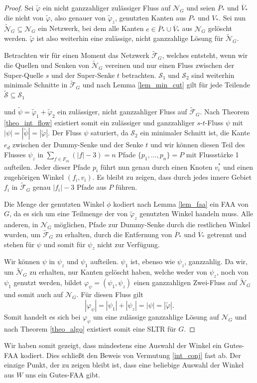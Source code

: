 \begin{proof}
Sei $\tilde{\varphi}$ ein nicht ganzzahliger zulässiger Fluss auf $\mathcal{N}_G$ und seien $\overline{P}_*$ und $\overline{V}_*$ die nicht von $\tilde{\varphi}$, also genauer von $\tilde{\varphi}_z$, genutzten Kanten aus $P_*$ und $V_*$. Sei nun $\tilde{\mathcal{N}}_G \subseteq \mathcal{N}_G$ ein Netzwerk, bei dem alle Kanten $e \in \overline{P}_*\cup\overline{V}_*$ aus $\mathcal{N}_G$ gelöscht werden. $\tilde{\varphi}$ ist also weiterhin eine zulässige, nicht ganzzahlige Lösung für $\tilde{\mathcal{N}}_G$.

Betrachten wir für einen Moment das Netzwerk $\tilde{\mathcal{F}}_G$, welches entsteht, wenn wir die Quellen und Senken von $\tilde{\mathcal{N}}_G$ vereinen und nur einen Fluss zwischen der Super-Quelle $s$ und der Super-Senke $t$ betrachten. $\mathcal{S}_1$ und $\mathcal{S}_2$ sind weiterhin minimale Schnitte in $\tilde{\mathcal{F}}_G$ und nach Lemma \ref{lem_min_cut} gilt für jede Teilende $\tilde{\mathcal{S}} \subseteq \mathcal{S}_1$


und $\tilde{\psi} = \tilde{\varphi}_1+ \tilde{\varphi}_2$ ein zulässiger, nicht ganzzahliger Fluss auf $\tilde{\mathcal{F}}_G$. Nach Theorem \ref{theo_int_flow} existiert somit ein zulässiger und ganzzahliger $s$-$t$-Fluss $\psi$ mit $|\psi| = |\tilde{\psi}| = |\tilde{\varphi}|.$ Der Fluss $\psi$ saturiert, da $\mathcal{S}_2$ ein minimaler Schnitt ist, die Kante $e_d$ zwischen der Dummy-Senke und der Senke $t$ und wir können diesen Teil des Flusses $\psi_z$ in $\sum_{f \in F_{in}}(|f|-3)=n$ Pfade $\{p_1, ... ,p_n\} = P$ mit Flussstärke 1 aufteilen. Jeder dieser Pfade $p_i$ führt nun genau durch einen Knoten $v_i^*$ und einen zugehörigen Winkel $(f_i,v_i)$. Es bleibt zu zeigen, dass durch jedes innere Gebiet $f_i$ in $\tilde{\mathcal{F}}_G$ genau $|f_i|-3$ Pfade aus $P$ führen.

Die Menge der genutzten Winkel $\phi$ kodiert nach Lemma \ref{lem_faa} ein FAA von $G$, da es sich um eine Teilmenge der von $\tilde{\varphi}_z$ genutzten Winkel handeln muss. Alle anderen, in $\mathcal{N}_G$ möglichen, Pfade zur Dummy-Senke durch die restlichen Winkel wurden, um $\tilde{\mathcal{F}}_G$ zu erhalten, durch die Entfernung von $\overline{P}_*$ und $\overline{V}_*$ getrennt und stehen für $\psi$ und somit für $\psi_z$ nicht zur Verfügung.

Wir können $\psi$ in $\psi_z$ und $\psi_1$ aufteilen. $\psi_1$ ist, ebenso wie $\psi_z$, ganzzahlig. Da wir, um $\tilde{\mathcal{N}}_G$ zu erhalten, nur Kanten gelöscht haben, welche weder von $\psi_z$, noch von $\psi_1$ genutzt werden, bildet $\varphi_\psi = (\psi_1,\psi_z)$ einen ganzzahligen Zwei-Fluss auf $\tilde{\mathcal{N}}_G$ und somit auch auf $\mathcal{N}_G$. Für diesen Fluss gilt
$$ |\varphi_\psi| = |\psi_1|+|\psi_z| = |\psi| = |\tilde{\varphi}|. $$
Somit handelt es sich bei $\varphi_\psi$ um eine zulässige ganzzahlige Lösung auf $\mathcal{N}_G$ und nach Theorem \ref{theo_algo} existiert somit eine SLTR für $G$.
\end{proof}

Wir haben somit gezeigt, dass mindestens eine Auswahl der Winkel ein Gutes-FAA kodiert. Dies schließt den Beweis von Vermutung \ref{int_conj} fast ab. Der einzige Punkt, der zu zeigen bleibt ist, dass eine beliebige Auswahl der Winkel aus $W$ uns ein Gutes-FAA gibt.

